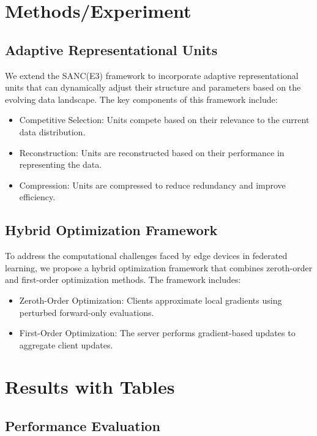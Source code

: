 \documentclass{article}
\begin{document}
\section{Methods/Experiment}
\label{sec:methods}

\subsection{Adaptive Representational Units}
\label{subsec:adaptive_units}

We extend the SANC(E3) framework to incorporate adaptive representational units that can dynamically adjust their structure and parameters based on the evolving data landscape. The key components of this framework include:
\begin{itemize}
    \item Competitive Selection: Units compete based on their relevance to the current data distribution.
    \item Reconstruction: Units are reconstructed based on their performance in representing the data.
    \item Compression: Units are compressed to reduce redundancy and improve efficiency.
\end{itemize}

\subsection{Hybrid Optimization Framework}
\label{subsec:hybrid_optimization}

To address the computational challenges faced by edge devices in federated learning, we propose a hybrid optimization framework that combines zeroth-order and first-order optimization methods. The framework includes:
\begin{itemize}
    \item Zeroth-Order Optimization: Clients approximate local gradients using perturbed forward-only evaluations.
    \item First-Order Optimization: The server performs gradient-based updates to aggregate client updates.
\end{itemize}

\section{Results with Tables}
\label{sec:results}

\subsection{Performance Evaluation}
\label{subsec:performance_evaluation}
\end{document}
